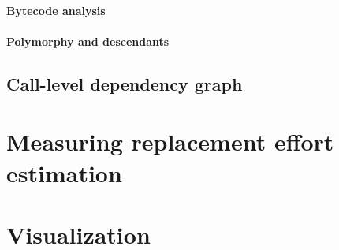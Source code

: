 \paragraph{Bytecode analysis}

\paragraph{Polymorphy and descendants}


\subsection{Call-level dependency graph}


\section{Measuring replacement effort estimation}

\section{Visualization}
